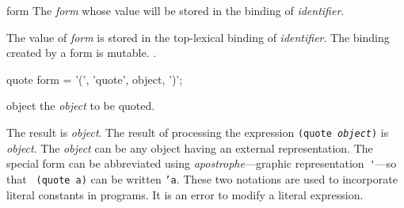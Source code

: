 \begin{optDefinition}
\begin{arguments}
    \item[form] The {\em form} whose value will be stored in the binding of {\em
        identifier}.
\end{arguments}
%
\remarks%
The value of {\em form} is stored in the top-lexical binding of {\em
    identifier}.  The binding created by a  form is mutable.
%
\seealso%
.

%
\Syntax
\savesyntax\quoteSyntax\vbox{\small\syntax
quote form
   = '(', 'quote', object, ')';
\endsyntax}
%
\begin{arguments}
    \item[object] the {\em object} to be quoted.
\end{arguments}
%
\result%
The result is {\em object}.
%
\remarks%
The result of processing the expression {\tt (quote {\em object})} is {\em
    object}.  The {\em object} can be any object having an external
representation.  The special form
 can be abbreviated using {\em apostrophe}---graphic
representation~\verb+'+---so that {\tt
    (quote a)} can be written {\tt 'a}.  These two notations are used to
incorporate literal constants in programs.  It
is an error to modify a literal expression.
\end{optDefinition}

